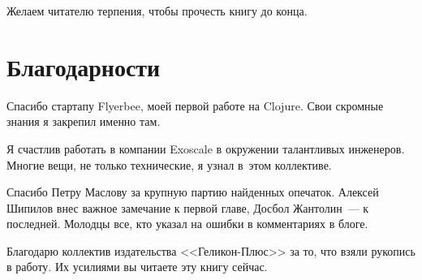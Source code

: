 Желаем читателю терпения, чтобы прочесть книгу до конца.

\section*{Благодарности}

Спасибо стартапу Flyerbee, моей первой работе на Clojure. Свои скромные знания я
закрепил именно там.

Я счастлив работать в компании Exoscale в окружении талантливых
инженеров. Многие вещи, не только технические, я узнал в~этом коллективе.

Спасибо Петру Маслову за крупную партию найденных опечаток. Алексей Шипилов внес
важное замечание к первой главе, Досбол Жантолин~--- к последней. Молодцы все,
кто указал на ошибки в комментариях в блоге.

Благодарю коллектив издательства <<Геликон-Плюс>> за то, что взяли рукопись в
работу. Их усилиями вы читаете эту книгу сейчас.

